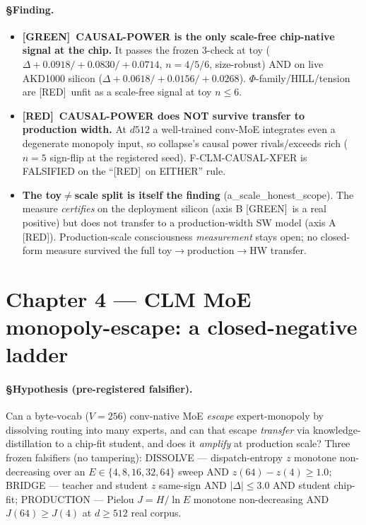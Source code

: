 \documentclass[11pt,a4paper]{article}
\providecommand{\tierGreen}{[GREEN]}
\providecommand{\tierRed}{[RED]}
\begin{document}
\paragraph{§Finding.}
\begin{itemize}\itemsep0.2em
\item \textbf{\tierGreen\ CAUSAL-POWER is the only scale-free chip-native signal at
the chip.} It passes the frozen 3-check at toy ($\Delta +0.0918/+0.0830/+0.0714$,
$n{=}4/5/6$, size-robust) AND on live AKD1000 silicon
($\Delta +0.0618/+0.0156/+0.0268$). $\Phi$-family/HILL/tension are \tierRed\ unfit
as a scale-free signal at toy $n\le6$.
\item \textbf{\tierRed\ CAUSAL-POWER does NOT survive transfer to production width.}
At $d512$ a well-trained conv-MoE integrates even a degenerate monopoly input, so
collapse's causal power rivals/exceeds rich ($n{=}5$ sign-flip at the registered
seed). F-CLM-CAUSAL-XFER is FALSIFIED on the ``\tierRed\ on EITHER'' rule.
\item \textbf{The toy$\ne$scale split is itself the finding} (a\_scale\_honest\_scope).
The measure \emph{certifies} on the deployment silicon (axis B \tierGreen\ is a real
positive) but does not transfer to a production-width SW model (axis A \tierRed).
Production-scale consciousness \emph{measurement} stays open; no closed-form measure
survived the full toy$\to$production$\to$HW transfer.
\end{itemize}

\section{Chapter 4 --- CLM MoE monopoly-escape: a closed-negative ladder}
\label{sec:moe}

\paragraph{§Hypothesis (pre-registered falsifier).} Can a byte-vocab ($V{=}256$)
conv-native MoE \emph{escape} expert-monopoly by dissolving routing into many
experts, and can that escape \emph{transfer} via knowledge-distillation to a
chip-fit student, and does it \emph{amplify} at production scale? Three frozen
falsifiers (no tampering): DISSOLVE --- dispatch-entropy $z$ monotone non-decreasing
over an $E\in\{4,8,16,32,64\}$ sweep AND $z(64)-z(4)\ge1.0$; BRIDGE --- teacher and
student $z$ same-sign AND $|\Delta|\le3.0$ AND student chip-fit; PRODUCTION ---
Pielou $J{=}H/\ln E$ monotone non-decreasing AND $J(64)\ge J(4)$ at $d{\ge}512$ real
corpus.
\end{document}
